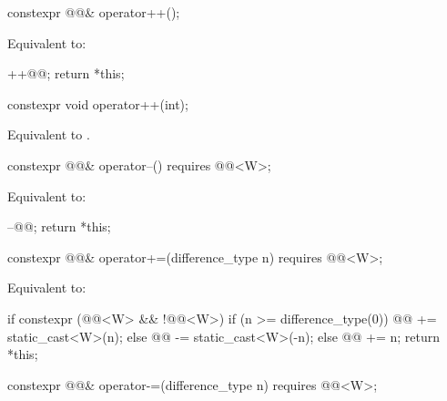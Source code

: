 \begin{itemdecl}
constexpr @@& operator++();
\end{itemdecl}

\begin{itemdescr}
\pnum
\effects
Equivalent to:
\begin{codeblock}
++@@;
return *this;
\end{codeblock}
\end{itemdescr}

\begin{itemdecl}
constexpr void operator++(int);
\end{itemdecl}

\begin{itemdescr}
\pnum
\effects
Equivalent to .
\end{itemdescr}

\begin{itemdecl}
constexpr @@& operator--() requires @@<W>;
\end{itemdecl}

\begin{itemdescr}
\pnum
\effects
Equivalent to:
\begin{codeblock}
--@@;
return *this;
\end{codeblock}
\end{itemdescr}

\begin{itemdecl}
constexpr @@& operator+=(difference_type n)
  requires @@<W>;
\end{itemdecl}

\begin{itemdescr}
\pnum
\effects
Equivalent to:
\begin{codeblock}
if constexpr (@@<W> && !@@<W>) {
  if (n >= difference_type(0))
    @@ += static_cast<W>(n);
  else
    @@ -= static_cast<W>(-n);
} else {
  @@ += n;
}
return *this;
\end{codeblock}
\end{itemdescr}

\begin{itemdecl}
constexpr @@& operator-=(difference_type n)
  requires @@<W>;
\end{itemdecl}

